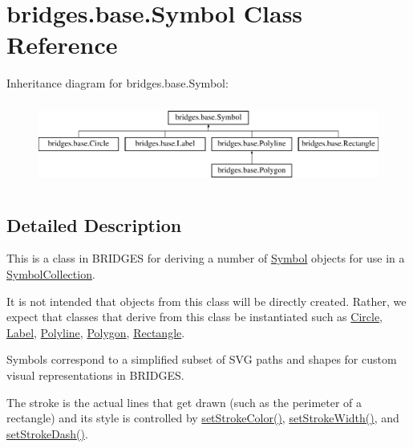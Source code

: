 \hypertarget{classbridges_1_1base_1_1_symbol}{}\section{bridges.\+base.\+Symbol Class Reference}
\label{classbridges_1_1base_1_1_symbol}
Inheritance diagram for bridges.\+base.\+Symbol\+:\begin{figure}[H]
\begin{center}
\leavevmode
\includegraphics[height=2.745098cm]{classbridges_1_1base_1_1_symbol}
\end{center}
\end{figure}


\subsection{Detailed Description}
This is a class in B\+R\+I\+D\+G\+ES for deriving a number of \hyperlink{classbridges_1_1base_1_1_symbol}{Symbol} objects for use in a \hyperlink{classbridges_1_1base_1_1_symbol_collection}{Symbol\+Collection}. 

It is not intended that objects from this class will be directly created. Rather, we expect that classes that derive from this class be instantiated such as \hyperlink{classbridges_1_1base_1_1_circle}{Circle}, \hyperlink{classbridges_1_1base_1_1_label}{Label}, \hyperlink{classbridges_1_1base_1_1_polyline}{Polyline}, \hyperlink{classbridges_1_1base_1_1_polygon}{Polygon}, \hyperlink{classbridges_1_1base_1_1_rectangle}{Rectangle}.

Symbols correspond to a simplified subset of S\+VG paths and shapes for custom visual representations in B\+R\+I\+D\+G\+ES.

The stroke is the actual lines that get drawn (such as the perimeter of a rectangle) and its style is controlled by \hyperlink{classbridges_1_1base_1_1_symbol_a387a5a5691e55e84a1d0367ca2066806}{set\+Stroke\+Color()}, \hyperlink{classbridges_1_1base_1_1_symbol_a68f46f0e555e916c59a69d2b3e9e495d}{set\+Stroke\+Width()}, and \hyperlink{classbridges_1_1base_1_1_symbol_ad36224ec7cb588dbbaa8040ef59ffbfc}{set\+Stroke\+Dash()}.

